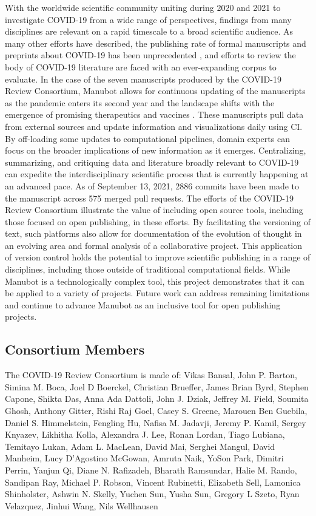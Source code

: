 \documentclass[twocolumn]{ceurart}
\begin{document}
With the worldwide scientific community uniting during 2020 and 2021 to investigate COVID-19 from a wide range of perspectives, findings from many disciplines are relevant on a rapid timescale to a broad scientific audience.
As many other efforts have described, the publishing rate of formal manuscripts and preprints about COVID-19 has been unprecedented \citep{7ub6VM4Z}, and efforts to review the body of COVID-19 literature are faced with an ever-expanding corpus to evaluate.
In the case of the seven manuscripts produced by the COVID-19 Review Consortium, Manubot allows for continuous updating of the manuscripts as the pandemic enters its second year and the landscape shifts with the emergence of promising therapeutics and vaccines \citep{njpLhBui}.
These manuscripts pull data from external sources and update information and visualizations daily using CI.
By off-loading some updates to computational pipelines, domain experts can focus on the broader implications of new information as it emerges.
Centralizing, summarizing, and critiquing data and literature broadly relevant to COVID-19 can expedite the interdisciplinary scientific process that is currently happening at an advanced pace.
As of September 13, 2021, 2886 commits have been made to the manuscript across 575 merged pull requests.
The efforts of the COVID-19 Review Consortium illustrate the value of including open source tools, including those focused on open publishing, in these efforts.
By facilitating the versioning of text, such platforms also allow for documentation of the evolution of thought in an evolving area and formal analysis of a collaborative project.
This application of version control holds the potential to improve scientific publishing in a range of disciplines, including those outside of traditional computational fields.
While Manubot is a technologically complex tool, this project demonstrates that it can be applied to a variety of projects.
Future work can address remaining limitations and continue to advance Manubot as an inclusive tool for open publishing projects.

\hypertarget{consortium-members}{%
\subsection*{Consortium Members}\label{consortium-members}}

The COVID-19 Review Consortium is made of:
Vikas Bansal, John P. Barton, Simina M. Boca, Joel D Boerckel, Christian Brueffer, James Brian Byrd, Stephen Capone, Shikta Das, Anna Ada Dattoli, John J. Dziak, Jeffrey M. Field, Soumita Ghosh, Anthony Gitter, Rishi Raj Goel, Casey S. Greene, Marouen Ben Guebila, Daniel S. Himmelstein, Fengling Hu, Nafisa M. Jadavji, Jeremy P. Kamil, Sergey Knyazev, Likhitha Kolla, Alexandra J. Lee, Ronan Lordan, Tiago Lubiana, Temitayo Lukan, Adam L. MacLean, David Mai, Serghei Mangul, David Manheim, Lucy D'Agostino McGowan, Amruta Naik, YoSon Park, Dimitri Perrin, Yanjun Qi, Diane N. Rafizadeh, Bharath Ramsundar, Halie M. Rando, Sandipan Ray, Michael P. Robson, Vincent Rubinetti, Elizabeth Sell, Lamonica Shinholster, Ashwin N. Skelly, Yuchen Sun, Yusha Sun, Gregory L Szeto, Ryan Velazquez, Jinhui Wang, Nils Wellhausen
\end{document}
